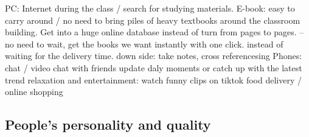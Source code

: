 \documentclass{ctexart}
\begin{document}
\begin{outline}
        \2 PC: Internet during the class / search for studying materials.
        \2 E-book: easy to carry around / no need to bring piles of heavy textbooks around the classroom building. Get into a huge online database instead of turn from pages to pages. -- no need to wait, get the books we want instantly with one click. instead of waiting for the delivery time.
            \3 down side: take notes, cross referencesing
        \2 Phones:
            \3 chat / video chat with friends
            \3 update daly moments or catch up with the latest trend
            \3 relaxation and entertainment: watch funny clips on tiktok
            \3 food delivery / online shopping
\end{outline}

\subsection{People's personality and quality}
\end{document}
